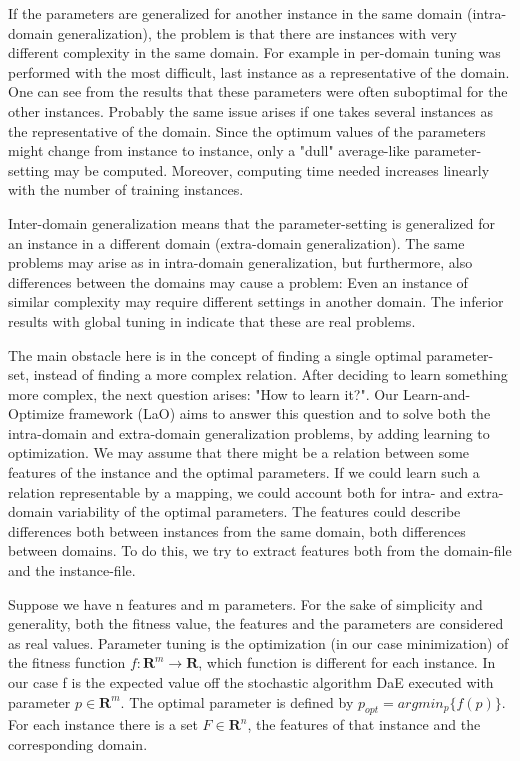 \documentclass{acm_proc_article-sp}
\begin{document}
If the parameters are generalized for another instance in the same domain (intra-domain generalization), the problem is that there are instances with very different complexity in the same domain. For example in \cite{BibGECCO:2010} per-domain tuning was performed with the most difficult, last instance as a representative of the domain. One can see from the results that these parameters were often suboptimal for the other instances. Probably the same issue arises if one takes several instances as the representative of the domain. Since the optimum values of the parameters might change from instance to instance, only a "dull" average-like parameter-setting may be computed. Moreover, computing time needed increases linearly with the number of training instances. 

Inter-domain generalization means that the parameter-setting is generalized for an instance in a different domain (extra-domain generalization). The same problems may arise as in intra-domain generalization, but furthermore, also differences between the domains may cause a problem: Even an instance of similar complexity may require different settings in another domain. The inferior results with global tuning in \cite{BibGECCO:2010} indicate that these are real problems.

The main obstacle here is in the concept of finding a single optimal parameter-set, instead of finding a more complex relation. After deciding to learn something more complex, the next question arises: "How to learn it?". Our Learn-and-Optimize framework (LaO) aims to answer this question and to solve both the intra-domain and extra-domain generalization problems, by adding learning to optimization. We may assume that there might be a relation between some features of the instance and the optimal parameters. If we could learn such a relation representable by a mapping, we could account both for intra- and extra-domain variability of the optimal parameters. The features could describe differences both between instances from the same domain, both differences between domains. To do this, we try to extract features both from the domain-file and the instance-file.

Suppose we have n features and m parameters. For the sake of simplicity and generality, both the fitness value, the features and the parameters are considered as real values. Parameter tuning is the optimization (in our case minimization) of the fitness function \begin{math}f:\mathbf{R}^m\to \mathbf{R} \end{math}, which function is different for each instance. In our case f is the expected value off the stochastic algorithm DaE executed with parameter \begin{math} p \in \mathbf{R}^m \end{math}. The optimal parameter is defined by \begin{math} p_{opt}=argmin_p\{f(p)\} \end{math}. For each instance there is a set \begin{math} F \in \mathbf{R}^n \end{math}, the features of that instance and the corresponding domain. 
\end{document}
